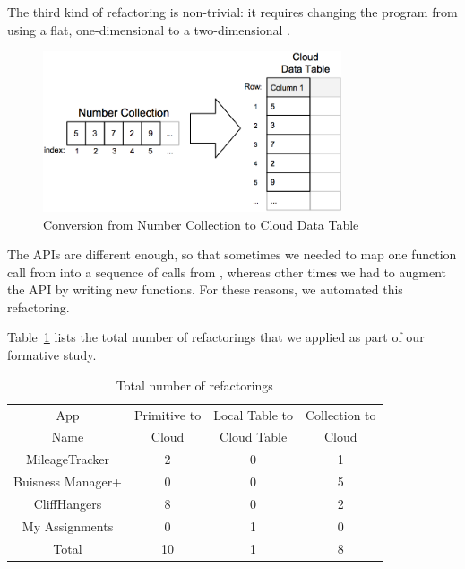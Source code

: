 \documentclass{sigplanconf}
\begin{document}
The third kind of refactoring is non-trivial: it requires changing the program from using a flat, one-dimensional  to a two-dimensional  .
\begin{figure}[htbp!]
\begin{center}
\includegraphics[width=250pt]{images/convertCollectionToTable}
\nocaptionrule
\caption{Conversion from Number Collection to Cloud Data Table}
\label{fig:ncToCDT}
\end{center}
\end{figure}
 The APIs are different enough, so that sometimes we needed to map one function call from  into a sequence of calls from , whereas other times we had to augment the API by writing new functions. 
For these reasons, we automated this refactoring. 

Table~\ref{tab:refactoringsFormative} lists the total number of refactorings that we applied as part of our formative study.

\begin{table}[htdp]

\begin{center}
\begin{tabular}{|c|c|c|c|}
\hline
App  & Primitive to  & Local Table to   & Collection to  \\
 Name &  Cloud  &  Cloud Table  & Cloud \\
\hline
MileageTracker & 2 & 0 & 1\\
\hline
Buisness Manager+ & 0 & 0 & 5\\
\hline
CliffHangers & 8 & 0 & 2\\
\hline
My Assignments & 0 & 1 & 0\\
\hline
\hline
Total & 10 & 1  & 8 \\
\hline
\end{tabular}
\end{center}
\nocaptionrule
\caption{Total number of refactorings}
\label{tab:refactoringsFormative}
\end{table}%
\end{document}
